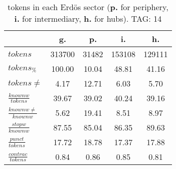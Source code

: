 \begin{table}[h!]
\begin{center}
\begin{tabular}{| l || c | c | c | c |}\hline
 & {\bf g.} & {\bf p.} & {\bf i.} & {\bf h.} \\\hline\hline
$tokens$ & 313700  & 31482  & 153108  & 129111 \\
$tokens_{\%}$ & 100.00  & 10.04  & 48.81  & 41.16 \\
$tokens \neq$ & 4.17  & 12.71  & 6.03  & 5.70 \\\hline
$\frac{knownw}{tokens}$ & 39.67  & 39.02  & 40.24  & 39.16 \\
$\frac{knownw \neq}{knownw}$ & 5.62  & 19.41  & 8.51  & 8.97 \\\hline
$\frac{stopw}{knownw}$ & 87.55  & 85.04  & 86.35  & 89.63 \\
$\frac{punct}{tokens}$ & 17.72  & 18.78  & 17.37  & 17.88 \\
$\frac{contrac}{tokens}$ & 0.84  & 0.86  & 0.85  & 0.81 \\\hline
\end{tabular}
\caption{tokens in each Erd\"os sector ({{\bf p.}} for periphery, {{\bf i.}} for intermediary, 
    {{\bf h.}} for hubs). TAG: 14}
\end{center}
\end{table}